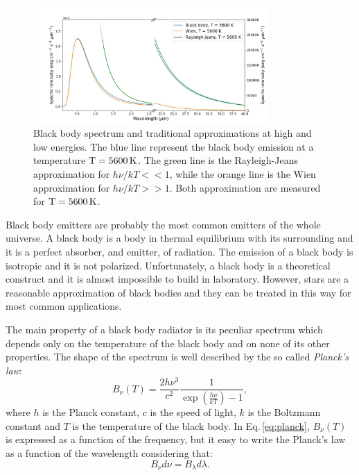 \documentclass[../main.tex]{subfiles}
\begin{document}
\begin{figure}
\centering
\includegraphics[width=0.8\textwidth]{PhD_thesis/images/BB.jpg} 
\caption[]{Black body spectrum and traditional approximations at high and low energies. The blue line represent the black body emission at a temperature $\rm T = 5600\,\si{K}$. The green line is the Rayleigh-Jeans approximation for $h\nu/kT<<1$, while the orange line is the Wien approximation for $h\nu/kT>>1$. Both approximation are measured for $\rm T = 5600\,\si{K}$.}
\label{fig:BB_emission}
\end{figure}

Black body emitters are probably the most common emitters of the whole universe.
A black body is a body in thermal equilibrium with its surrounding and it is a perfect absorber, and emitter, of radiation.
The emission of a black body is isotropic and it is not polarized.
Unfortunately, a black body is a theoretical construct and it is almost impossible to build in laboratory.
However, stars are a reasonable approximation of black bodies and they can be treated in this way for most common applications.

The main property of a black body radiator is its peculiar spectrum which depends only on the temperature of the black body and on none of its other properties.
The shape of the spectrum is well described by the so called \emph{Planck's law}:
\begin{equation}
    \label{eq:planck}
    B_{\nu}(T) = \frac{2h\nu^3}{c^2}\frac{1}{\exp{\left(\frac{h\nu}{kT}\right)} - 1},
\end{equation}
where $h$ is the Planck constant, $c$ is the speed of light, $k$ is the Boltzmann constant and $T$ is the temperature of the black body.
In Eq.\,\ref{eq:planck}, $B_{\nu}(T)$ is expressed as a function of the frequency, but it easy to write the Planck's law as a function of the wavelength considering that:
\begin{equation}
    \label{eq:transform}
    B_{\nu}d\nu = B_{\lambda}d\lambda.
\end{equation}
\end{document}
